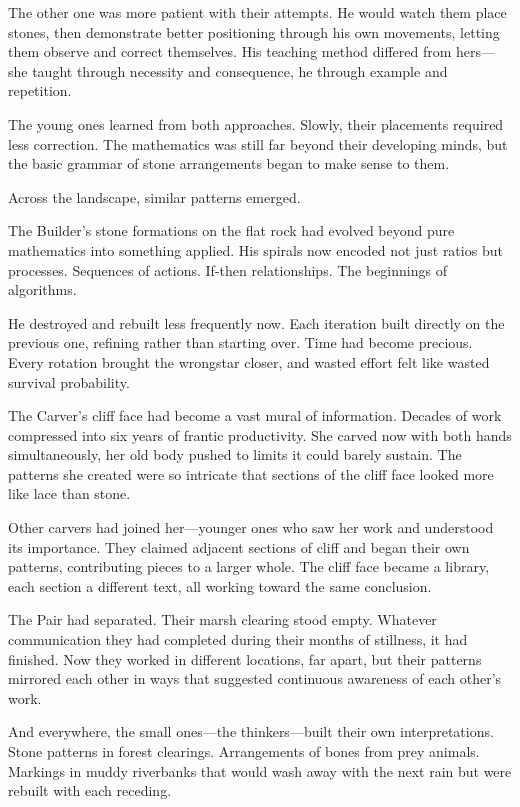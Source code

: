 The other one was more patient with their attempts. He would watch them place stones, then demonstrate better positioning through his own movements, letting them observe and correct themselves. His teaching method differed from hers—she taught through necessity and consequence, he through example and repetition.

The young ones learned from both approaches. Slowly, their placements required less correction. The mathematics was still far beyond their developing minds, but the basic grammar of stone arrangements began to make sense to them.

\scenebreak

Across the landscape, similar patterns emerged.

The Builder's stone formations on the flat rock had evolved beyond pure mathematics into something applied. His spirals now encoded not just ratios but processes. Sequences of actions. If-then relationships. The beginnings of algorithms.

He destroyed and rebuilt less frequently now. Each iteration built directly on the previous one, refining rather than starting over. Time had become precious. Every rotation brought the wrongstar closer, and wasted effort felt like wasted survival probability.

The Carver's cliff face had become a vast mural of information. Decades of work compressed into six years of frantic productivity. She carved now with both hands simultaneously, her old body pushed to limits it could barely sustain. The patterns she created were so intricate that sections of the cliff face looked more like lace than stone.

Other carvers had joined her—younger ones who saw her work and understood its importance. They claimed adjacent sections of cliff and began their own patterns, contributing pieces to a larger whole. The cliff face became a library, each section a different text, all working toward the same conclusion.

The Pair had separated. Their marsh clearing stood empty. Whatever communication they had completed during their months of stillness, it had finished. Now they worked in different locations, far apart, but their patterns mirrored each other in ways that suggested continuous awareness of each other's work.

And everywhere, the small ones—the thinkers—built their own interpretations. Stone patterns in forest clearings. Arrangements of bones from prey animals. Markings in muddy riverbanks that would wash away with the next rain but were rebuilt with each receding.

